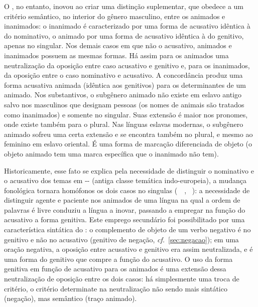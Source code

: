 O , no entanto, inovou ao criar uma distinção suplementar, que
obedece a um critério semântico, no interior do gênero masculino, entre os
animados e inanimados: o inanimado é caracterizado por uma forma de acusativo
idêntica à do nominativo, o animado por uma forma de acusativo idêntica à do
genitivo, apenas no singular.
Nos demais casos em que não o acusativo, animados e inanimados possuem as mesmas
formas.
Há assim para os animados uma neutralização da oposição entre caso acusativo e
genitivo e, para os inanimados, da oposição entre o caso nominativo e acusativo.
A concordância produz uma forma acusativa animada (idêntica aos genitivos) para
os determinantes de um animado.
Nos substantivos, o subgênero animado não existe em eslavo antigo salvo nos
masculinos que designam pessoas (os nomes de animais são tratados como
inanimados) e somente no singular.
Suas extensão é maior nos pronomes, onde existe também para o plural.
Nas línguas eslavas modernas, o subgênero animado sofreu uma certa extensão e se
encontra também no plural, e mesmo ao feminino em eslavo oriental.
É uma forma de marcação diferenciada de objeto (o objeto animado tem uma marca
específica que o inanimado não tem).

Historicamente, esse fato se explica pela necessidade de distinguir o nominativo
e o acusativo dos temas em -- (antiga classe temática indo-europeia),
a mudança fonológica tornara homófonos os dois casos no singulas
(~~,
\mbox{~}): a necessidade de distinguir agente e paciente nos
animados de uma língua na qual a ordem de palavras é livre conduziu a língua a
inovar, passando a empregar na função do acusativo a forma genitiva.
Este emprego secundário foi possibilitado por uma característica sintática do
: o complemento de objeto de um verbo negativo é no genitivo e não
no acusativo (genitivo de negação, \emph{cf.}~\ref{sec:negacao}); em uma oração
negativa, a oposição entre acusativo e genitivo era assim neutralizada, e é uma
forma do genitivo que compre a função do acusativo.
O uso da forma genitiva em função de acusativo para os animados é uma extensão
dessa neutralização de oposição entre os dois casos: há simplesmente uma troca
de critério, o critério determinate na neutralização não sendo mais sintático
(negação), mas semântico (traço animado).


